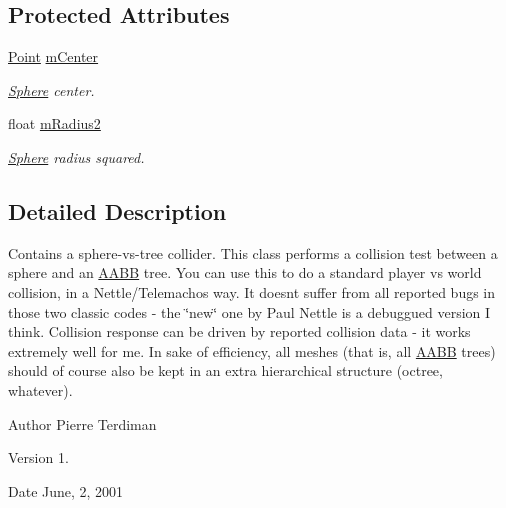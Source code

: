 \subsection*{Protected Attributes}
\begin{DoxyCompactItemize}
\item 
\hyperlink{classPoint}{Point} \hyperlink{classSphereCollider_ae8ec8e2adbc34a34157272fe728899af}{m\+Center}\hypertarget{classSphereCollider_ae8ec8e2adbc34a34157272fe728899af}{}\label{classSphereCollider_ae8ec8e2adbc34a34157272fe728899af}

\begin{DoxyCompactList}\small\item\em \hyperlink{classSphere}{Sphere} center. \end{DoxyCompactList}\item 
float \hyperlink{classSphereCollider_aecd3702a63f1197551254c802fe53fdc}{m\+Radius2}\hypertarget{classSphereCollider_aecd3702a63f1197551254c802fe53fdc}{}\label{classSphereCollider_aecd3702a63f1197551254c802fe53fdc}

\begin{DoxyCompactList}\small\item\em \hyperlink{classSphere}{Sphere} radius squared. \end{DoxyCompactList}\end{DoxyCompactItemize}


\subsection{Detailed Description}
Contains a sphere-\/vs-\/tree collider. This class performs a collision test between a sphere and an \hyperlink{classAABB}{A\+A\+BB} tree. You can use this to do a standard player vs world collision, in a Nettle/\+Telemachos way. It doesn\textquotesingle{}t suffer from all reported bugs in those two classic codes -\/ the \char`\"{}new\char`\"{} one by Paul Nettle is a debuggued version I think. Collision response can be driven by reported collision data -\/ it works extremely well for me. In sake of efficiency, all meshes (that is, all \hyperlink{classAABB}{A\+A\+BB} trees) should of course also be kept in an extra hierarchical structure (octree, whatever).

\begin{DoxyAuthor}{Author}
Pierre Terdiman 
\end{DoxyAuthor}
\begin{DoxyVersion}{Version}
1. 
\end{DoxyVersion}
\begin{DoxyDate}{Date}
June, 2, 2001 
\end{DoxyDate}


